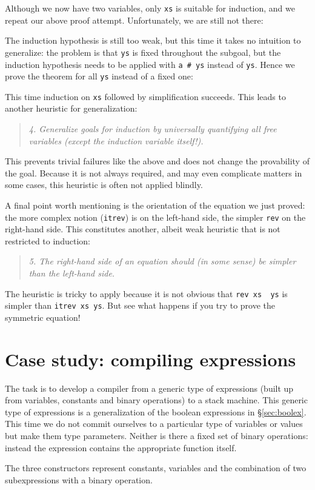 Although we now have two variables, only \texttt{xs} is suitable for
induction, and we repeat our above proof attempt. Unfortunately, we are still
not there:
\begin{ttbox}\makeatother
{}
\end{ttbox}
The induction hypothesis is still too weak, but this time it takes no
intuition to generalize: the problem is that \texttt{ys} is fixed throughout
the subgoal, but the induction hypothesis needs to be applied with
\texttt{a \# ys} instead of \texttt{ys}. Hence we prove the theorem
for all \texttt{ys} instead of a fixed one:
\begin{ttbox}\makeatother
\end{ttbox}
This time induction on \texttt{xs} followed by simplification succeeds. This
leads to another heuristic for generalization:
\begin{quote}
{\em 4. Generalize goals for induction by universally quantifying all free
variables {\em(except the induction variable itself!)}.}
\end{quote}
This prevents trivial failures like the above and does not change the
provability of the goal. Because it is not always required, and may even
complicate matters in some cases, this heuristic is often not
applied blindly.

A final point worth mentioning is the orientation of the equation we just
proved: the more complex notion (\texttt{itrev}) is on the left-hand
side, the simpler \texttt{rev} on the right-hand side. This constitutes
another, albeit weak heuristic that is not restricted to induction:
\begin{quote}
  {\em 5. The right-hand side of an equation should (in some sense) be
    simpler than the left-hand side.}
\end{quote}
The heuristic is tricky to apply because it is not obvious that
\texttt{rev xs \at\ ys} is simpler than \texttt{itrev xs ys}. But see what
happens if you try to prove the symmetric equation!


\section{Case study: compiling expressions}
\label{sec:ExprCompiler}

The task is to develop a compiler from a generic type of expressions (built
up from variables, constants and binary operations) to a stack machine.  This
generic type of expressions is a generalization of the boolean expressions in
\S\ref{sec:boolex}.  This time we do not commit ourselves to a particular
type of variables or values but make them type parameters.  Neither is there
a fixed set of binary operations: instead the expression contains the
appropriate function itself.
\begin{ttbox}
\end{ttbox}
The three constructors represent constants, variables and the combination of
two subexpressions with a binary operation.

